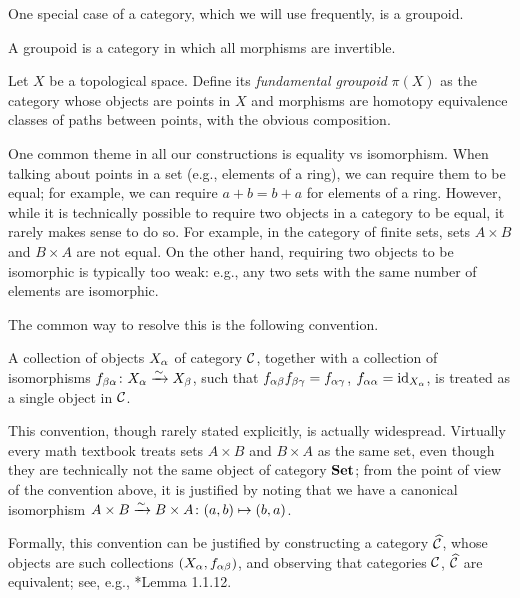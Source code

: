 One special case of a category, which we will use frequently, is a groupoid.
\begin{definition}
  A groupoid is a category in which all morphisms are invertible.
\end{definition}
\begin{example}
  Let $X$ be a topological space. Define its \emph{fundamental groupoid}
  $\pi(X)$ as the category whose objects are points in $X$ and morphisms
  are homotopy equivalence classes of paths between points, with the obvious
  composition.
\end{example}

One common theme in all our constructions is equality vs isomorphism. When
talking about points in a set (e.g., elements of a ring), we can require them to
be equal; for example, we can require $a+b=b+a$ for elements of a ring. However,
while it is technically possible to require two objects in a category to be
equal, it rarely makes sense to do so. For example, in the category of finite
sets, sets $A\times B$ and $B\times A$ are not equal. On the other hand,
requiring two objects to be isomorphic is typically too weak: e.g., any two sets
with the same number of elements are isomorphic.

The common way to resolve this is the following convention.
\begin{convention}\label{conv:canonical}
  A collection of objects $X_\alpha$ of category $\mathcal{C}$, together with a
  collection of isomorphisms $f_{\beta\alpha}\colon X_\alpha \xrightarrow{\sim} X_\beta$, such that
  $f_{\alpha\beta}f_{\beta\gamma}=f_{\alpha\gamma}$, $f_{\alpha\alpha}=\operatorname{id}_{X_\alpha}$, is treated as a
  single object in $\mathcal{C}$.
\end{convention}
This convention, though rarely stated explicitly, is actually widespread.
Virtually every math textbook treats sets $A\times B$ and $B\times A$ as the
same set, even though they are technically not the same object of category
$\mathbf{Set}$; from the point of view of the convention above, it is justified by
noting that we have a canonical isomorphism $A\times B\xrightarrow{\sim} B\times A\colon
(a,b)\mapsto (b,a)$.

Formally, this convention can be justified by constructing a category
$\widehat{\mathcal{C}}$, whose objects are such collections $(X_\alpha, f_{\alpha\beta})$, and
observing that categories $\mathcal{C}$, $\widehat{\mathcal{C}}$ are equivalent; see, e.g.,
*{Lemma 1.1.12}.


